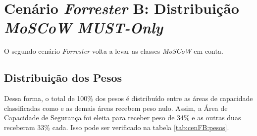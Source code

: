 \newcommand{\cenFB}{Cenário \emph{Forrester} B: Distribuição \emph{MoSCoW} \emph{MUST-Only}} 
\section{\cenFB}
\label{sec-cenfb}

    O segundo cenário \emph{Forrester} volta a levar as classes \emph{MoSCoW} em conta.
    
\subsection*{Distribuição dos Pesos}    

    Dessa forma, o total de 100\% dos pesos é distribuído entre as áreas de capacidade classificadas como \MUST e as demais áreas recebem peso nulo. Assim, a Área de Capacidade de Segurança foi eleita para receber peso de 34\% e as outras duas receberam 33\% cada. Isso pode ser verificado na tabela \ref{tab:cenFB:pesos}.
    
